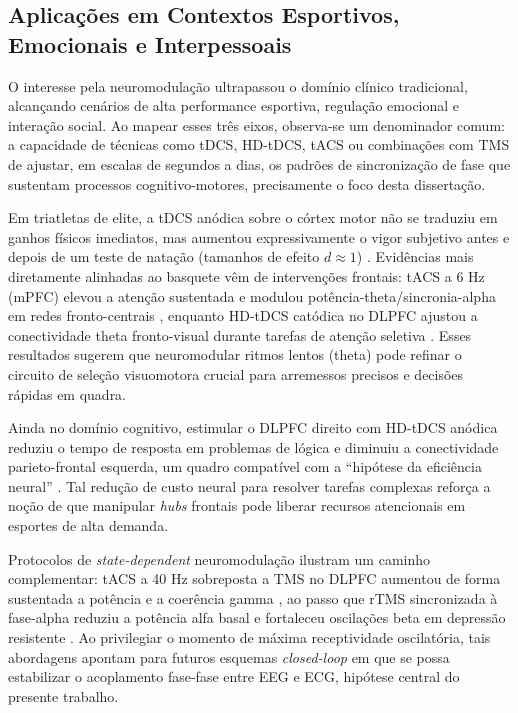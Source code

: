 \subsection{Aplicações em Contextos Esportivos, Emocionais e Interpessoais}
O interesse pela neuromodulação ultrapassou o domínio clínico tradicional, alcançando cenários de alta performance esportiva, regulação emocional e interação social. Ao mapear esses três eixos, observa-se um denominador comum: a capacidade de técnicas como tDCS, HD-tDCS, tACS ou combinações com TMS de ajustar, em escalas de segundos a dias, os padrões de sincronização de fase que sustentam processos cognitivo-motores, precisamente o foco desta dissertação.

Em triatletas de elite, a tDCS anódica sobre o córtex motor não se traduziu em ganhos físicos imediatos, mas aumentou expressivamente o vigor subjetivo antes e depois de um teste de natação (tamanhos de efeito \(d\approx1\)) \cite{valenzuela2019enhancement}. Evidências mais diretamente alinhadas ao basquete vêm de intervenções frontais: tACS a 6 Hz (mPFC) elevou a atenção sustentada e modulou potência-theta/sincronia-alpha em redes fronto-centrais \cite{rostami2020transcranial}, enquanto HD-tDCS catódica no DLPFC ajustou a conectividade theta fronto-visual durante tarefas de atenção seletiva \cite{spooner2020hdtdcs}. Esses resultados sugerem que neuromodular ritmos lentos (theta) pode refinar o circuito de seleção visuomotora crucial para arremessos precisos e decisões rápidas em quadra.

Ainda no domínio cognitivo, estimular o DLPFC direito com HD-tDCS anódica reduziu o tempo de resposta em problemas de lógica e diminuiu a conectividade parieto-frontal esquerda, um quadro compatível com a ``hipótese da eficiência neural'' \cite{arif2021high}. Tal redução de custo neural para resolver tarefas complexas reforça a noção de que manipular \textit{hubs} frontais pode liberar recursos atencionais em esportes de alta demanda.

Protocolos de \emph{state-dependent} neuromodulação ilustram um caminho complementar: tACS a 40 Hz sobreposta a TMS no DLPFC aumentou de forma sustentada a potência e a coerência gamma \cite{maiella2022simultaneous}, ao passo que rTMS sincronizada à fase-alpha reduziu a potência alfa basal e fortaleceu oscilações beta em depressão resistente \cite{zrenner2020brain}. Ao privilegiar o momento de máxima receptividade oscilatória, tais abordagens apontam para futuros esquemas \textit{closed-loop} em que se possa estabilizar o acoplamento fase-fase entre EEG e ECG, hipótese central do presente trabalho.

